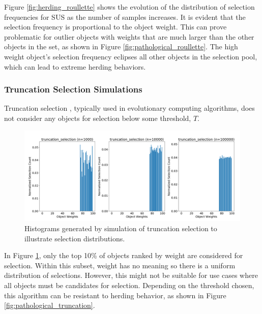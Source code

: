 \documentclass[12pt]{article}
\begin{document}
    Figure \ref{fig:herding_roullette} shows the evolution of the
    distribution of selection frequencies for SUS as the number of samples
    increases. It is evident that the selection frequency is proportional to the
    object weight. This can prove problematic for outlier objects with weights
    that are much larger than the other objects in the set, as shown in Figure
    \ref{fig:pathological_roullette}. The high weight object's selection
    frequency eclipses all other objects in the selection pool, which can lead
    to extreme herding behaviors.

    \subsubsection{Truncation Selection Simulations}
    Truncation selection \cite{truncation1973}, typically used in evolutionary
    computing algorithms, does not consider any objects for selection below
    some threshold, $T$. 

    \begin{figure}[htbp]
      \centering
      \includegraphics[scale=0.32]{images/herding_truncation.png} 
      \caption{Histograms generated by simulation of truncation selection
               to illustrate selection distributions.}
      \label{fig:herding_truncation}
    \end{figure}
    \FloatBarrier

    In Figure \ref{fig:herding_truncation}, only the top 10\% of objects ranked
    by weight are considered for selection. Within this subset, weight has no
    meaning so there is a uniform distribution of selections. However, this
    might not be suitable for use cases where all objects must be candidates
    for selection.  Depending on the threshold chosen, this algorithm can be
    resistant to herding behavior, as shown in Figure
    \ref{fig:pathological_truncation}. 
\end{document}
